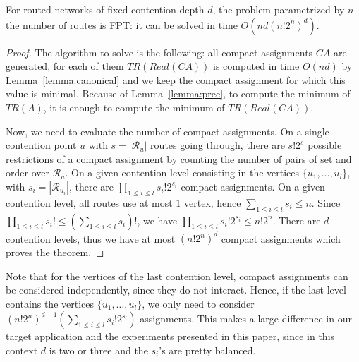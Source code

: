 \documentclass[english]{article}
\begin{document}

\begin{theorem}\label{theorem:FPT}
For routed networks of fixed contention depth $d$, the problem \spall parametrized by $n$ the number of routes is FPT: it can be solved in time $O(nd(n!2^{n})^{d})$.
\end{theorem}
\begin{proof}
The algorithm to solve \spall is the following: all compact assignments $CA$ are generated, for each of them $TR(Real(CA))$ is computed in time
$O(nd)$ by Lemma~\ref{lemma:canonical} and we keep the compact assignment for which this value is minimal.  Because of Lemma~\ref{lemma:prec}, to compute the minimum of $TR(A)$, it is enough 
to compute the minimum of $TR(Real(CA))$.

 Now, we need to evaluate the number of compact assignments. 
On a single contention point $u$ with $s = |\mathcal{R}_u|$ routes going through, there are $s!2^s$ possible restrictions of a compact assignment by counting the number of pairs of set and order over $\mathcal{R}_u$.
On a given contention level consisting in the vertices $\{u_1,\dots,u_l\}$, with $s_i = |\mathcal{R}_{u_{i}}|$, there are 
$\prod_{1 \leq i\leq l} s_i!2^{s_i}$ compact assignments. On a given contention level, all routes use at most $1$ vertex, hence $\sum_{1 \leq i\leq l} s_i \leq n$. Since $\prod_{1 \leq i\leq l} s_i! \leq (\sum_{1 \leq i\leq l} s_i)!$, we have $\prod_{1 \leq i\leq l} s_i!2^{s_i} \leq n!2^n$. There are $d$ contention levels, thus we have at most $ (n!2^{n})^{d}$ compact assignments which proves the theorem.
\end{proof}

Note that for the vertices of the last contention level, compact assignments can be considered independently, since
they do not interact. Hence, if the last level contains the vertices $\{u_1,\dots,u_l\}$, we only need to consider $(n!2^{n})^{d-1}(\sum_{1 \leq i\leq l} s_{i}!2^{s_i})$ assignments. This makes a large difference in our target application and the experiments presented in this paper, since in this context $d$ is two or three and the $s_i$'s are pretty balanced.
\end{document}
